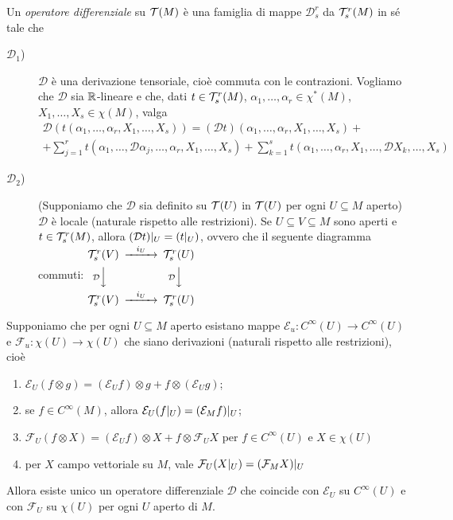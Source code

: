 \begin{definition} 
	Un \emph{operatore differenziale} su $\mathcal T(M)$ è una famiglia di mappe $\mathcal D_s^r$ da $\mathcal T_s^r(M)$ in sé tale che
	\begin{description}
	 \item [$\mathcal D_1$)] $\mathcal D$ è una derivazione tensoriale, cioè commuta con le contrazioni.
	 Vogliamo che $\mathcal D$ sia $\mathbb R$-lineare e che, dati $t\in\mathcal T_s^r(M)$, $\alpha_1,\ldots,\alpha_r\in\chi^*(M)$, $X_1,\ldots,X_s\in\chi(M)$, valga
	 \begin{multline*}
	 	\mathcal D (t(\alpha_1,\ldots,\alpha_r,X_1,\ldots,X_s)) = (\mathcal D t) (\alpha_1,\ldots,\alpha_r,X_1,\ldots,X_s) +\\
	 	+\sum_{j=1}^r t(\alpha_1,\ldots,\mathcal D \alpha_j,\ldots, \alpha_r, X_1,\ldots, X_s) +
	 	\sum_{k=1}^s t(\alpha_1,\ldots, \alpha_r, X_1,\ldots, \mathcal D X_k,\ldots, X_s)
	 \end{multline*}

	\item [$\mathcal D_2$)] (Supponiamo che $\mathcal D$ sia definito su $\mathcal T(U)$ in $\mathcal T(U)$ per ogni $U\subseteq M$ aperto) $\mathcal D$ è locale (naturale rispetto alle restrizioni).
	Se $U\subseteq V \subseteq M$ sono aperti e $t\in\mathcal T_s^r(M)$, allora $(\mathcal D t)|_ U = \mathcal (t|_ U)$, ovvero che il seguente diagramma commuti:
	$
	\begin{CD} 
	 \Tau_s^r(V) @>i_U>> \Tau_s^r(U) \\
	 @V\mathcal{D}VV  @V\mathcal{D}VV \\
	 \Tau_s^r(V) @>i_U>> \Tau_s^r(U) 
	\end{CD} $

	\end{description}
\end{definition}

\begin{theorem} \label{teo:EsistenzaOperatoriDifferenziali}
	Supponiamo che per ogni $U\subseteq M$ aperto esistano mappe $\mathcal E_u : C^\infty(U) \to C^\infty(U)$ e $\mathcal F_u : \chi(U) \to \chi(U)$ che siano derivazioni (naturali rispetto alle restrizioni), cioè
	\begin{enumerate}
		\item $\mathcal E_U(f\otimes g) = (\mathcal E_U f) \otimes g + f \otimes (\mathcal E_U g)$; \label{eod:LeibnitzPerE}
		\item se $f\in C^\infty(M)$, allora $\mathcal E_U(f|_ U) = (\mathcal E_M f)|_ U$; \label{eod:LocalitaPerE}
		\item $\mathcal F_U(f\otimes X) = (\mathcal E_U f) \otimes X + f\otimes \mathcal F_U X$ per $f\in C^\infty(U)$ e $X\in\chi(U)$ \label{eod:LeibnitzPerF}
		\item per $X$ campo vettoriale su $M$, vale $\mathcal F_U(X|_ U) = (\mathcal F_M X)|_ U$ \label{eod:LocalitaPerF}
	\end{enumerate}
	Allora esiste unico un operatore differenziale $\mathcal D$ che coincide con $\mathcal E_U$ su $C^\infty(U)$ e con $\mathcal F_U$ su $\chi(U)$ per ogni $U$ aperto di $M$.

\end{theorem}


